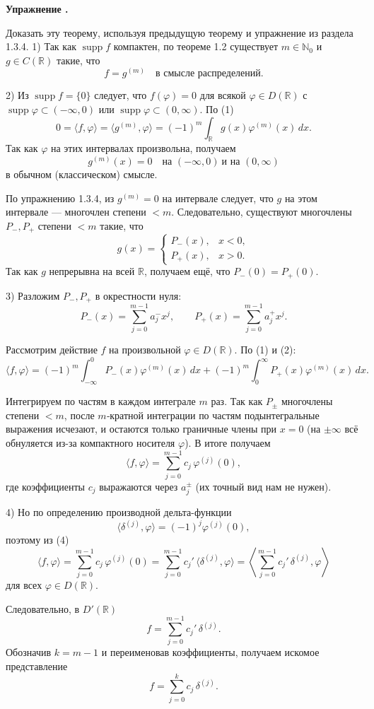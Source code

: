 \documentclass[11pt,a4paper]{report}
\numberwithin{equation}{section}
\numberwithin{figure}{chapter}
\numberwithin{table}{chapter}
\newif\ifinmathphysstatement
\newenvironment{myexe}[1][]{%
    \refstepcounter{exectr}%
    \inmathphysstatementtrue
    \begin{tcolorbox}[mathphysblock,colframe=exercisecolor,colback=exercisecolor!3,#1]
    \textbf{\color{exercisecolor}Упражнение \theexectr.}\par\smallskip
}{%
    \end{tcolorbox}
    \inmathphysstatementfalse
}
\newcommand{\supp}{\operatorname{supp}}
\begin{document}
\begin{myexe}
    Доказать эту теорему, используя предыдущую теорему и упражнение из раздела 1.3.4.
1) Так как $\supp f$ компактен, по теореме 1.2 существует
$m\in\mathbb N_0$ и $g\in C(\mathbb R)$ такие, что
\[
f = g^{(m)} \quad\text{в смысле распределений.}
\tag{1}
\]

2) Из $\supp f=\{0\}$ следует, что $f(\varphi)=0$ для всякой
$\varphi\in D(\mathbb R)$ с $\supp\varphi\subset(-\infty,0)$ или
$\supp\varphi\subset(0,\infty)$. По (1)
\[
0 = \langle f,\varphi\rangle = \langle g^{(m)},\varphi\rangle
= (-1)^m\int_{\mathbb R} g(x)\varphi^{(m)}(x)\,dx.
\]
Так как $\varphi$ на этих интервалах произвольна, получаем
\[
g^{(m)}(x)=0 \quad \text{на }(-\infty,0)\ \text{и на }(0,\infty)
\]
в обычном (классическом) смысле.

По упражнению 1.3.4, из $g^{(m)}=0$ на интервале следует, что $g$
на этом интервале — многочлен степени $<m$. Следовательно,
существуют многочлены $P_-,P_+$ степени $<m$ такие, что
\[
g(x)=
\begin{cases}
P_-(x), & x<0,\\[1mm]
P_+(x), & x>0.
\end{cases}
\tag{2}
\]
Так как $g$ непрерывна на всей $\mathbb R$, получаем ещё, что
$P_-(0)=P_+(0)$.

3) Разложим $P_-,P_+$ в окрестности нуля:
\[
P_-(x)=\sum_{j=0}^{m-1} a_j^- x^j,\qquad
P_+(x)=\sum_{j=0}^{m-1} a_j^+ x^j.
\]

Рассмотрим действие $f$ на произвольной $\varphi\in D(\mathbb R)$.
По (1) и (2):
\[
\langle f,\varphi\rangle
= (-1)^m\int_{-\infty}^{0} P_-(x)\varphi^{(m)}(x)\,dx
 +(-1)^m\int_{0}^{\infty} P_+(x)\varphi^{(m)}(x)\,dx.
\tag{3}
\]

Интегрируем по частям в каждом интеграле $m$ раз.
Так как $P_\pm$ многочлены степени $<m$, после $m$‑кратной
интеграции по частям подынтегральные выражения исчезают, и остаются
только граничные члены при $x=0$ (на $\pm\infty$ всё обнуляется из-за
компактного носителя $\varphi$). В итоге получаем
\[
\langle f,\varphi\rangle
= \sum_{j=0}^{m-1} c_j\,\varphi^{(j)}(0),
\tag{4}
\]
где коэффициенты $c_j$ выражаются через $a_j^\pm$ (их точный вид нам не
нужен).

4) Но по определению производной дельта-функции
\[
\langle \delta^{(j)},\varphi\rangle = (-1)^j \varphi^{(j)}(0),
\]
поэтому из (4)
\[
\langle f,\varphi\rangle
= \sum_{j=0}^{m-1} c_j\,\varphi^{(j)}(0)
= \sum_{j=0}^{m-1} c_j' \,\langle \delta^{(j)},\varphi\rangle
= \left\langle \sum_{j=0}^{m-1} c_j'\,\delta^{(j)},\varphi\right\rangle
\]
для всех $\varphi\in D(\mathbb R)$.

Следовательно, в $D'(\mathbb R)$
\[
f = \sum_{j=0}^{m-1} c_j'\,\delta^{(j)}.
\]
Обозначив $k=m-1$ и переименовав коэффициенты, получаем искомое
представление
\[
f = \sum_{j=0}^{k} c_j\,\delta^{(j)}.\]
\end{myexe}
\end{document}
